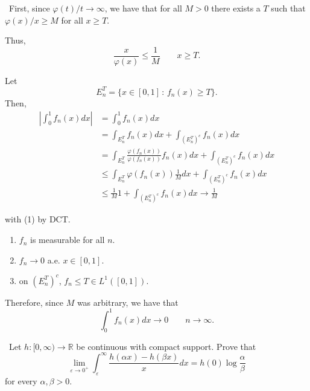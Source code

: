 \documentclass[12pt]{Qual}
\begin{document}
\begin{solution}$\,$
First, since $\varphi(t)/t\to\infty$, we have that for all $M>0$ there exists a $T$ such that $\varphi(x)/x\ge M$ for all $x\ge T.$

Thus, $$\frac{x}{\varphi(x)}\le\frac{1}{M}\qquad x\ge T.$$

Let $$E_n^T=\{x\in[0,1]\,:\,f_n(x)\ge T\}.$$ Then, \begin{align*}
    \left|\int_0^1f_n(x)dx\right|&=\int_0^1f_n(x)dx\\
    &=\int_{E_n^T}f_n(x)dx+\int_{(E_n^T)^c}f_n(x)dx\\
    &=\int_{E_n^T}\frac{\varphi(f_n(x))}{\varphi(f_n(x))}f_n(x)dx+\int_{(E_n^T)^c}f_n(x)dx\\
    &\le\int_{E_n^T}\varphi(f_n(x))\frac{1}{M}dx+\int_{(E_n^T)^c}f_n(x)dx\\
    &\le\frac{1}{M}1+\int_{(E_n^T)^c}f_n(x)dx\to\frac{1}{M}\tag{1}
\end{align*}

with (1) by DCT. \begin{enumerate}
    \item $f_n$ is measurable for all $n$.
    \item $f_n\to0$ a.e. $x\in[0,1]$.
    \item on $(E_n^T)^c$, $f_n\le T\in L^1([0,1])$.
\end{enumerate}

Therefore, since $M$ was arbitrary, we have that $$\int_0^1f_n(x)dx\to0\qquad n\to\infty.$$
\end{solution}
\newpage



\begin{problem} $\,$
Let $h:[0,\infty)\to\mathbb{R}$ be continuous with compact support. Prove that $$\lim_{\varepsilon\to0^+}\int_\varepsilon^\infty\frac{h(\alpha x)-h(\beta x)}{x}dx=h(0)\log\frac{\alpha}{\beta}$$ for every $\alpha,\beta>0.$
\end{problem}
\end{document}
